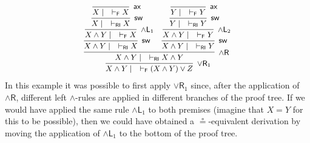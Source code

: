 \documentclass[submission,copyright,creativecommons]{eptcs}
\theoremstyle{definition}
\newcommand{\andlone}{\land \mathsf{L}_{1}}
\newcommand{\andltwo}{\land \mathsf{L}_{2}}
\newcommand{\andr}{\land \mathsf{R}}
\newcommand{\orrone}{\lor \mathsf{R}_{1}}
\newcommand{\ax}{\mathsf{ax}}
\newcommand{\RI}{\mathsf{RI}}
\newcommand{\F}{\mathsf{F}}
\newcommand{\sw}{\mathsf{sw}}
\begin{document}
\begin{equation}\label{eq:ex:focused}
  \small
  \begin{array}{c}
     \infer[\orrone]{X \land Y \mid \quad \vdash_\F (X \land Y) \lor Z}{
      \infer[\andr]{X \land Y \mid \quad \vdash_\RI X \land Y}{
        \infer[\sw]{X \land Y \mid \quad \vdash_\RI X}{
          \infer[\andlone]{X \land Y \mid \quad \vdash_\F X}{
          \infer[\sw]{X \mid \quad \vdash_\RI X}{
          \infer[\ax]{X \mid \quad \vdash_\F X}{}
        }}}
        &
        \infer[\sw]{X \land Y \mid \quad \vdash_\RI Y}{
        \infer[\andltwo]{X \land Y \mid \quad \vdash_\F Y}{
          \infer[\sw]{Y \mid \quad \vdash_\RI Y}{
          \infer[\ax]{Y \mid \quad \vdash_\F Y}{}
        }}}
      }
    }
  \end{array}
\end{equation}
In this example it was possible to first apply $\orrone$ since, after the application of $\andr$, different left \linebreak$\land$-rules are applied in different branches of the proof tree. If we would have applied  the same rule $\andlone$ to both premises (imagine that $X = Y$ for this to be possible), then we could have obtained a $\circeq$-equivalent derivation by moving the application of $\andlone$ to the bottom of the proof tree. 
\end{document}
